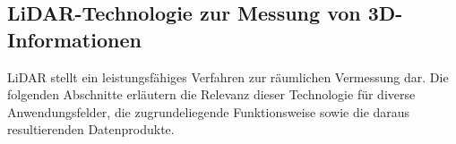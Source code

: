 \subsection{LiDAR-Technologie zur Messung von 3D-Informationen}

LiDAR stellt ein leistungsfähiges Verfahren zur räumlichen Vermessung dar. Die folgenden Abschnitte erläutern die Relevanz dieser Technologie für diverse Anwendungsfelder, die zugrundeliegende Funktionsweise sowie die daraus resultierenden Datenprodukte.
